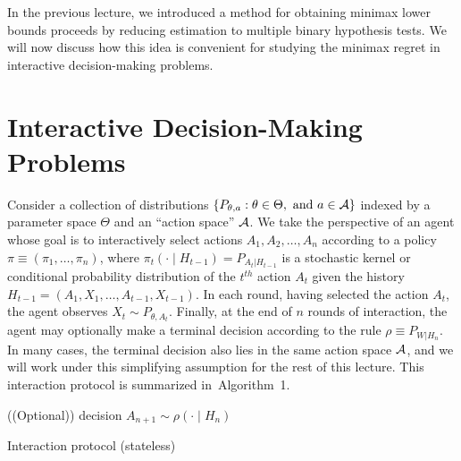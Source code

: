 \documentclass[12pt]{article}
\begin{document}
	\MakeScribeTop


In the previous lecture, we introduced a method for obtaining minimax lower bounds proceeds by reducing estimation to multiple binary hypothesis tests. We will now discuss how this idea is convenient for studying the minimax regret in interactive decision-making problems.  

\section{Interactive Decision-Making Problems} 
\label{sec:interactive-decision-making}

Consider a collection of distributions $\{P_{\theta, a}: \theta \in \Theta, \text{ and } a \in {\cal A}\}$ indexed by a parameter space $\Theta$ and an ``action space'' ${\cal A}$. 
We take the perspective of an agent whose goal is to interactively select actions $A_1, A_2, \ldots, A_n$ according to a policy $\pi \equiv (\pi_1, \ldots, \pi_n)$, where $\pi_t(\cdot \mid H_{t-1}) = P_{A_t|H_{t-1}}$ is a stochastic kernel or conditional probability distribution of the $t^{th}$ action $A_t$ given the history $H_{t-1} = (A_1, X_1, \ldots, A_{t-1}, X_{t-1})$. In each round, having selected the action $A_t$, the agent observes $X_t \sim P_{\theta, A_t}$. Finally, at the end of $n$ rounds of interaction, the agent may optionally make a terminal decision according to the rule $\rho \equiv P_{W|H_n}$. In many cases, the terminal decision also lies in the same action space ${\cal A}$, and we will work under this simplifying assumption for the rest of this lecture. This interaction protocol is summarized in~Algorithm~1. 
\vspace{1em}

\begin{algorithm}[H]
	\label{algo:interaction-protocol}
	((Optional)) decision $A_{n+1} \sim \rho(\cdot \mid H_n)$ 
	\caption{ Interaction protocol (stateless)}
\end{algorithm}
\end{document}
